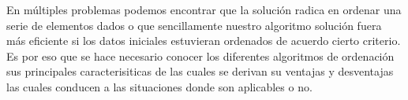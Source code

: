En múltiples problemas podemos encontrar que la solución radica en ordenar una serie de elementos dados o que sencillamente nuestro algoritmo solución fuera más eficiente si los datos iniciales estuvieran ordenados de acuerdo cierto criterio. Es por eso que se hace necesario conocer los diferentes algoritmos de ordenación sus principales caracterisiticas de las cuales se derivan su ventajas y desventajas  las cuales conducen a las situaciones donde son aplicables o no.